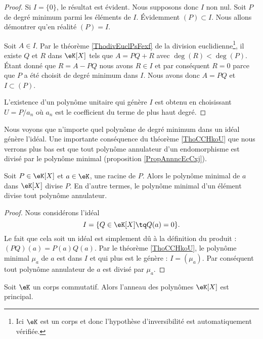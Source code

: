 \begin{proof}
    Si \( I=\{ 0 \}\), le résultat est évident. Nous supposons donc \( I\) non nul. Soit \( P\) de degré minimum parmi les éléments de \( I\). Évidemment \( (P)\subset I\). Nous allons démontrer qu'en réalité \( (P)=I\).

    Soit \( A\in I\). Par le théorème \ref{ThodivEuclPsFexf} de la division euclidienne\footnote{Ici \( \eK\) est un corps et donc l'hypothèse d'inversibilité est automatiquement vérifiée.}, il existe \( Q\) et \( R\) dans \( \eK[X]\) tels que \( A=PQ+R\) avec \( \deg(R)<\deg(P)\). Étant donné que \( R=A-PQ\) nous avons \( R\in I\) et par conséquent \( R=0\) parce que \( P\) a été choisit de degré minimum dans \( I\). Nous avons donc \( A=PQ\) et \( I\subset (P)\).

    L'existence d'un polynôme unitaire qui génère \( I\) est obtenu en choisissant \( U=P/a_n\) où \( a_n\) est le coefficient du terme de plus haut degré.
\end{proof}
Nous voyons que n'importe quel polynôme de degré minimum dans un idéal génère l'idéal. Une importante conséquence du théorème \ref{ThoCCHkoU} que nous verrons plus bas est que tout polynôme annulateur d'un endomorphisme est divisé par le polynôme minimal (proposition \ref{PropAnnncEcCxj}).

\begin{corollary}
    Soit \( P\in \eK[X]\) et \( a\in \eK\), une racine de \( P\). Alors le polynôme minimal de \( a\) dans \( \eK[X]\) divise \( P\). En d'autre termes, le polynôme minimal d'un élément divise tout polynôme annulateur.
\end{corollary}

\begin{proof}
    Nous considérons l'idéal
    \begin{equation}
        I=\{ Q\in \eK[X]\tq Q(a)=0 \}.
    \end{equation}
    Le fait que cela soit un idéal est simplement dû à la définition du produit : \( (PQ)(a)=P(a)Q(a)\). Par le théorème \ref{ThoCCHkoU}, le polynôme minimal \( \mu_a\) de \( a\) est dans \( I\) et qui plus est le génère : \( I=(\mu_a)\). Par conséquent tout polynôme annulateur de \( a\) est divisé par \( \mu_a\).
\end{proof}

\begin{corollary}       \label{CorvlvOWA}
    Soit \( \eK\) un corps commutatif. Alors l'anneau des polynômes \( \eK[X]\) est principal.
\end{corollary}

